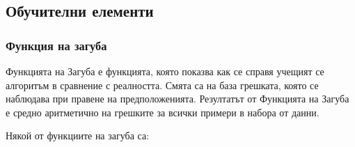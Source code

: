 \documentclass{article}
\begin{document}
    \subsection{Обучителни елементи}

    \subsubsection{Функция на загуба}

    Функцията на Загуба е функцията, която показва как се справя учещият се алгоритъм в сравнение с реалността. Смята са на
    база грешката, която се наблюдава при правене на предположенията. Резултатът от Функцията на Загуба е средно
    аритметично на грешките за всички примери в набора от данни. \cite{deep-learning-practitioner}

    Някой от функциите на загуба са:
\end{document}
